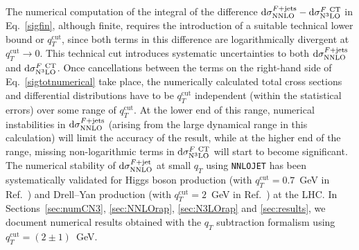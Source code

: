\documentclass[12pt]{article}
\def\to{\rightarrow}
\DeclareRobustCommand{\qt}{q_T}
\DeclareRobustCommand{\qtcut}{\ensuremath{q_T^\mathrm{cut}}}
\DeclareRobustCommand{\rd}{\ensuremath{\mathrm{d}}}
\begin{document}
The numerical computation of the integral of the difference $\rd{\sigma}_{\rm{NNLO}}^{F+{\rm jets}}-\rd{\sigma}_{\rm{N}^3\rm{LO}}^{F {\rm\ CT}}$ in Eq.~\eqref{sigfin}, although finite, requires the introduction of a suitable technical lower bound or $\qtcut$, since both terms in this difference are logarithmically divergent at $\qtcut \to 0$. 
 This technical cut introduces systematic uncertainties to both $\rd{\sigma}_{\rm{NNLO}}^{F+{\rm jets}}$ and $\rd{\sigma}_{\rm{N}^3\rm{LO}}^{F {\rm\ CT}}$. Once cancellations between the terms on the right-hand side of Eq.~\eqref{sigtotnumerical} take place, the numerically calculated total cross sections and differential distributions have to be $\qtcut$ independent (within the statistical errors) over some range of $\qtcut$. At the lower end of this range, 
numerical instabilities in $\rd{\sigma}_{\rm{NNLO}}^{F+{\rm jets}}$ (arising from the large dynamical range in this calculation) 
will limit the accuracy of the result, while at the 
higher end of the range, missing non-logarithmic terms in  $\rd{\sigma}_{\rm{N}^3\rm{LO}}^{F {\rm\ CT}}$ will start to 
become significant. 
 The numerical stability of $\rd{\sigma}_{\rm{NNLO}}^{F+{\rm jet}}$ at small $\qt$ using \texttt{NNLOJET} has been systematically validated for Higgs boson production (with $\qtcut=0.7$~GeV in Ref.~\cite{Chen:2018pzu}) and Drell--Yan production (with $\qtcut=2$~GeV in Ref.~\cite{Bizon:2018foh}) at the LHC. In Sections~\ref{sec:numCN3}, \ref{sec:NNLOrap}, \ref{sec:N3LOrap} and \ref{sec:results}, we document numerical results obtained with the $\qt$ subtraction formalism using $\qtcut=(2\pm 1)$~GeV.



\end{document}
